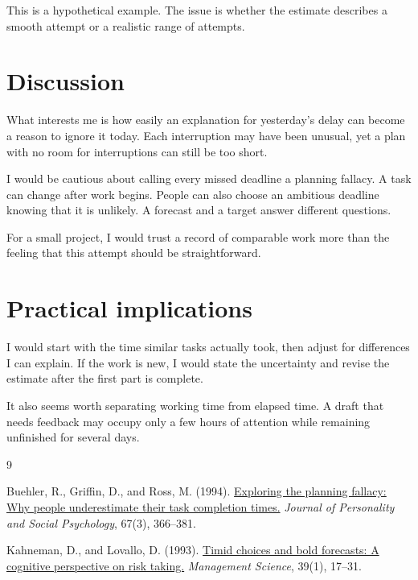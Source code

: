 \documentclass[11pt,a4paper]{article}
\begin{document}
This is a hypothetical example. The issue is whether the estimate
describes a smooth attempt or a realistic range of attempts.

\section{Discussion}

What interests me is how easily an explanation for yesterday's delay can
become a reason to ignore it today. Each interruption may have been
unusual, yet a plan with no room for interruptions can still be too short.

I would be cautious about calling every missed deadline a planning
fallacy. A task can change after work begins. People can also choose an
ambitious deadline knowing that it is unlikely. A forecast and a target
answer different questions.

For a small project, I would trust a record of comparable work more than
the feeling that this attempt should be straightforward.

\section{Practical implications}

I would start with the time similar tasks actually took, then adjust
for differences I can explain. If the work is new, I would state the
uncertainty and revise the estimate after the first part is complete.

It also seems worth separating working time from elapsed time.
A draft that needs feedback may occupy only a few hours of attention
while remaining unfinished for several days.

\renewcommand{\refname}{References}
\begin{thebibliography}{9}
\small
\setlength{\itemsep}{0.35em}

Buehler, R., Griffin, D., and Ross, M. (1994).
\href{https://doi.org/10.1037/0022-3514.67.3.366}
{Exploring the planning fallacy: Why people underestimate their task completion times.}
\textit{Journal of Personality and Social Psychology}, 67(3), 366--381.

Kahneman, D., and Lovallo, D. (1993).
\href{https://doi.org/10.1287/mnsc.39.1.17}
{Timid choices and bold forecasts: A cognitive perspective on risk taking.}
\textit{Management Science}, 39(1), 17--31.

\end{thebibliography}
\end{document}
